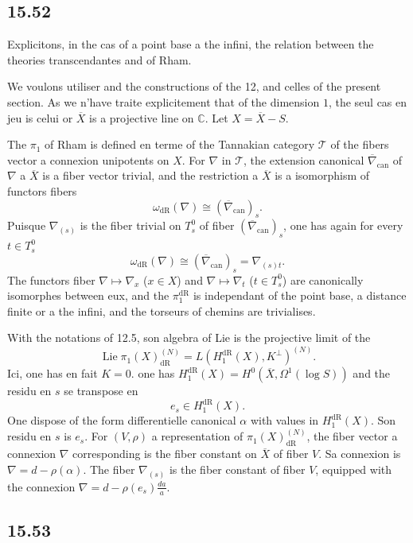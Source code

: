 \documentclass[12pt,a4paper]{article}
\theoremstyle{plain}
\theoremstyle{definition}
\theoremstyle{remark}
\DeclareMathOperator{\Lie}{Lie}
\newcommand{\bC}{\mathbb{C}}
\newcommand{\dr}{\mathrm{dR}}
\begin{document}
\subsection*{15.52}

Explicitons, in the cas of a point base a the infini, the relation between the theories transcendantes and of Rham.

We voulons utiliser and the constructions of the 12, and celles of the present section. As we n'have traite explicitement that of the dimension $1$, the seul cas en jeu is celui or $\overline{X}$ is a projective line on $\bC$. Let $X = \overline{X} - S$.

The $\pi_1$ of Rham is defined en terme of the Tannakian category $\mathcal{T}$ of the fibers vector a connexion unipotents on $X$. For $\nabla$ in $\mathcal{T}$, the extension canonical $\overline{\nabla}_{\text{can}}$ of $\nabla$ a $\overline{X}$ is a fiber vector trivial, and the restriction a $\overline{X}$ is a isomorphism of functors fibers
\[
\omega_{\dr}(\nabla) \cong (\overline{\nabla}_{\text{can}})_s.
\]
Puisque $\nabla_{(s)}$ is the fiber trivial on $T_s^0$ of fiber $(\overline{\nabla}_{\text{can}})_s$, one has again for every $t \in T_s^0$
\[
\omega_{\dr}(\nabla) \cong (\overline{\nabla}_{\text{can}})_s = \nabla_{(s)t}.
\]
The functors fiber $\nabla \mapsto \nabla_x$ ($x \in X$) and $\nabla \mapsto \nabla_t$ ($t \in T_s^0$) are canonically isomorphes between eux, and the $\pi_1^{\dr}$ is independant of the point base, a distance finite or a the infini, and the torseurs of chemins are trivialises.

With the notations of 12.5, son algebra of Lie is the projective limit of the
\[
\Lie \pi_1(X)_{\dr}^{(N)} = L(H_1^{\dr}(X), K^\perp)^{(N)}.
\]
Ici, one has en fait $K = 0$. one has $H_{1}^{\dr}(X) = H^0(\overline{X}, \Omega^1(\log S))$ and the residu en $s$ se transpose en
\[
e_s \in H_{1}^{\dr}(X).
\]
One dispose of the form differentielle canonical $\alpha$ with values in $H_1^{\dr}(X)$. Son residu en $s$ is $e_s$. For $(V, \rho)$ a representation of $\pi_1(X)_{\dr}^{(N)}$, the fiber vector a connexion $\nabla$ corresponding is the fiber constant on $\overline{X}$ of fiber $V$. Sa connexion is $\nabla = d - \rho(\alpha)$. The fiber $\nabla_{(s)}$ is the fiber constant of fiber $V$, equipped with the connexion $\nabla = d - \rho(e_s) \frac{da}{a}$.

\subsection*{15.53}
\end{document}
